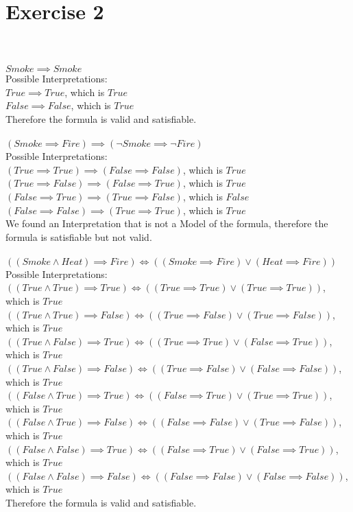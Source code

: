 \documentclass{article}
\begin{document}
\section*{Exercise 2}
\paragraph{}~\\~\\
$Smoke \implies Smoke$\\
Possible Interpretations:\\
$True \implies True$, which is $True$\\
$False \implies False$, which is $True$\\
Therefore the formula is valid and satisfiable.\\
\\
$(Smoke \implies Fire) \implies (\lnot Smoke \implies \lnot Fire)$\\
Possible Interpretations:\\
$(True \implies True) \implies (False \implies False)$, which is $True$\\
$(True \implies False) \implies (False \implies True)$, which is $True$\\
$(False \implies True) \implies (True \implies False)$, which is $False$\\
$(False \implies False) \implies (True \implies True)$, which is $True$\\
We found an Interpretation that is not a Model of the formula, therefore the formula is satisfiable but not valid.\\
\\
$((Smoke \land Heat) \implies Fire) \iff ((Smoke \implies Fire) \lor (Heat \implies Fire))$\\
Possible Interpretations:\\
$((True \land True) \implies True) \iff ((True \implies True) \lor (True \implies True))$, which is $True$\\
$((True \land True) \implies False) \iff ((True \implies False) \lor (True \implies False))$, which is $True$\\
$((True \land False) \implies True) \iff ((True \implies True) \lor (False \implies True))$, which is $True$\\
$((True \land False) \implies False) \iff ((True \implies False) \lor (False \implies False))$, which is $True$\\
$((False \land True) \implies True) \iff ((False \implies True) \lor (True \implies True))$, which is $True$\\
$((False \land True) \implies False) \iff ((False \implies False) \lor (True \implies False))$, which is $True$\\
$((False \land False) \implies True) \iff ((False \implies True) \lor (False \implies True))$, which is $True$\\
$((False \land False) \implies False) \iff ((False \implies False) \lor (False \implies False))$, which is $True$\\
Therefore the formula is valid and satisfiable.\\
\end{document}
